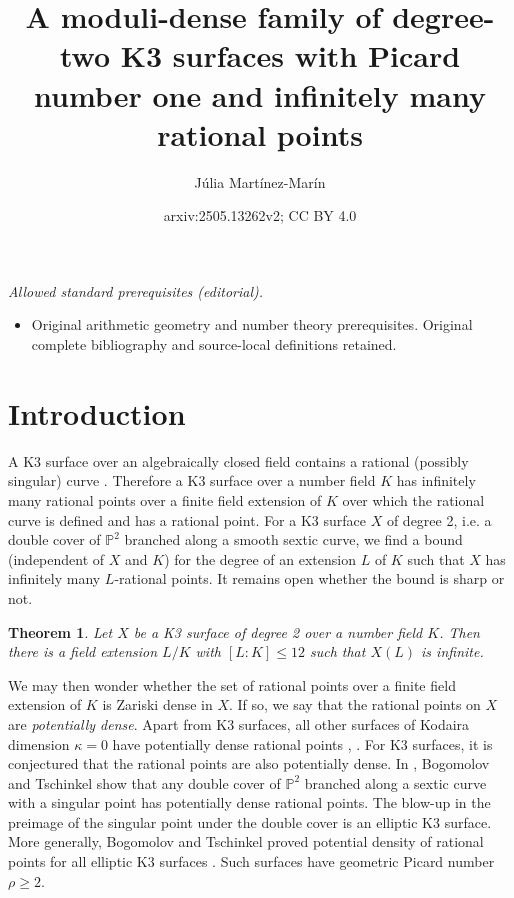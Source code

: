 \documentclass[11pt]{amsart}
\title{A moduli-dense family of degree-two K3 surfaces with Picard number one and infinitely many rational points}
\author{Júlia Martínez-Marín}
\date{arxiv:2505.13262v2; CC BY 4.0}
\newcommand{\PP}{\mathbb{P}}
\theoremstyle{plain}
\newtheorem{theorem}[lemma]{Theorem}
\theoremstyle{remark}
\begin{document}
\maketitle
\noindent\textit{Allowed standard prerequisites (editorial).}\begin{itemize}
\item Original arithmetic geometry and number theory prerequisites. Original complete bibliography and source-local definitions retained.
\end{itemize}\medskip
\section{Introduction}


A K3 surface over an algebraically closed field contains a rational (possibly singular) curve \cite[Appendix]{mm}. Therefore a K3 surface over a number field $K$ has infinitely many rational points over a finite field extension of $K$ over which the rational curve is defined and has a rational point. For a K3 surface $X$ of degree 2, i.e. a double cover of $\PP^2$ branched along a smooth sextic curve, we find a bound (independent of $X$ and $K$) for the degree of an extension $L$ of $K$ such that $X$ has infinitely many $L$-rational points. It remains open whether the bound is sharp or not. 

\begin{theorem}\label{bound}
     Let $X$ be a K3 surface of degree 2 over a number field $K$. Then there is a field extension $L/K$ with $[L:K]\leq 12$ such that $X(L)$ is infinite.
\end{theorem}

We may then wonder whether the set of rational points over a finite field extension of $K$ is Zariski dense in $X$. If so, we say that the rational points on $X$ are \emph{potentially dense}. Apart from K3 surfaces, all other surfaces of Kodaira dimension $\kappa=0$ have potentially dense rational points \cite[Proposition 4.2]{hasset}, \cite[Theorem 3.1]{enriques}. For K3 surfaces, it is conjectured that the rational points are also potentially dense. In \cite{bogo2}, Bogomolov and Tschinkel show that any double cover of $\PP^2$ branched along a sextic curve with a singular point has potentially dense rational points. The blow-up in the preimage of the singular point under the double cover is an elliptic K3 surface. More generally, Bogomolov and Tschinkel proved potential density of rational points for all elliptic K3 surfaces \cite{Bog}. Such surfaces have geometric Picard number $\rho \geq 2$. 
\end{document}
